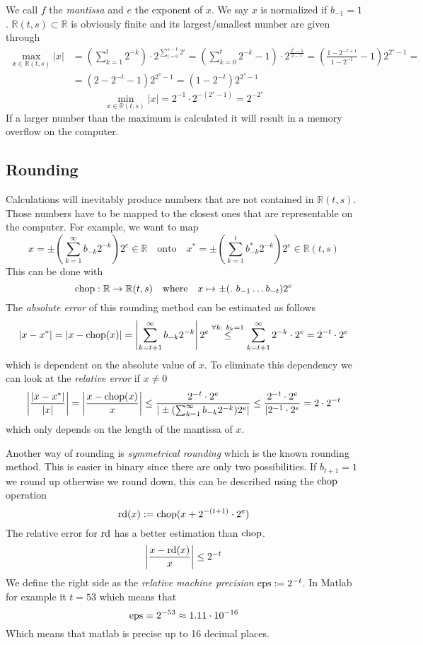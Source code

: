 We call \(f\) the \emph{mantissa} and \(e\) the exponent of \(x\).
We say \(x\) is normalized if \(b_{-1} = 1\).
\(\mathbb{R}(t,s) \subset \mathbb{R}\) is obviously finite and its largest/smallest number are given through
\begin{equation*}
   \begin{split}
      \max_{x \in \mathbb{R}(t,s)} |x| & = \left(\sum_{k = 1}^t 2^{-k}\right) \cdot 2^{\sum_{i = 0}^{s-t} 2^i} = \left(\sum_{k=0}^t 2^{-k} -1\right) \cdot 2^\frac{2^s - 1}{2-1} = \left(\frac{1 - 2^{-t+1}}{1 - 2^{-1}} - 1\right) 2^{2^s - 1} = \\
                                       & = (2 - 2^{-t} - 1) 2^{2^s - 1} = (1 - 2^{-t})2^{2^s - 1}
   \end{split}
\end{equation*}
\[\min_{x \in \mathbb{R}(t,s)} |x| = 2^{-1} \cdot 2^{-(2^s - 1)} = 2^{-2^s}\]
If a larger number than the maximum is calculated it will result in a memory overflow on the computer.

\subsection{Rounding}
Calculations will inevitably produce numbers that are not contained in \(\mathbb{R}(t,s)\).
Those numbers have to be mapped to the closest ones that are representable on the computer.
For example, we want to map
\[x = \pm\left(\sum_{k=1}^\infty b_{-k} 2^{-k}\right)2^e \in \mathbb{R} \quad\text{onto}\quad x^{\ast} = \pm \left(\sum_{k=1}^t b_{-k}^\ast 2^{-k}\right)2^e \in \mathbb{R}(t,s)\]
This can be done with
\[\operatorname{chop}: \mathbb{R} \to \mathbb{R}(t,s) \quad\text{where}\quad x \mapsto \pm(.~b_{-1}\ldots b_{-t}) 2^e\]
The \emph{absolute error} of this rounding method can be estimated as follows
\[|x - x^\ast| = |x - \operatorname{chop}(x)| = \left|\sum_{k=t+1}^\infty b_{-k} 2^{-k}\right|2^e \overset{\forall k:~b_k = 1}{\leq} \sum_{k=t+1}^\infty 2^{-k} \cdot 2^e = 2^{-t} \cdot 2^e\]
which is dependent on the absolute value of \(x\).
To eliminate this dependency we can look at the \emph{relative error} if \(x \neq 0\)
\[\left|\frac{|x - x^\ast|}{|x|}\right| = \left|\frac{x - \operatorname{chop}(x)}{x}\right| \leq \frac{2^{-t} \cdot 2^e}{|\pm (\sum_{k=1}^\infty b_{-k} 2^{-k}) 2^e|} \leq \frac{2^{-t} \cdot 2^e}{|2^{-1} \cdot 2^e} = 2 \cdot 2^{-t}\]
which only depends on the length of the mantissa of \(x\).

Another way of rounding is \emph{symmetrical rounding} which is the known rounding method.
This is easier in binary since there are only two possibilities.
If \(b_{t+1} = 1\) we round up otherwise we round down, this can be described using the \(\operatorname{chop}\) operation
\[\operatorname{rd}(x) := \operatorname{chop}(x + 2^{-(t+1)} \cdot 2^e)\]
The relative error for \(\operatorname{rd}\) has a better estimation than \(\operatorname{chop}\).
\[\left|\frac{x - \operatorname{rd}(x)}{x}\right| \leq 2^{-t}\]
We define the right side as the \emph{relative machine precision} \(\operatorname{eps} := 2^{-t}\).
In Matlab for example it \(t = 53\) which means that
\[\operatorname{eps} = 2^{-53} \approx 1.11 \cdot 10^{-16}\]
Which means that matlab is precise up to 16 decimal places.


